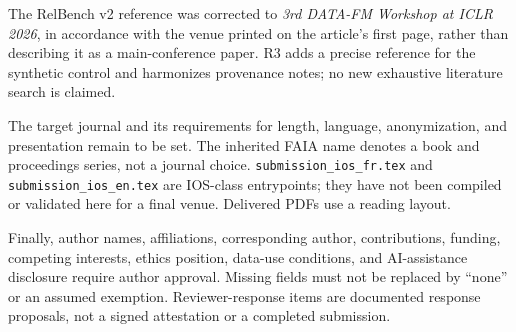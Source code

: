 \documentclass[10pt,a4paper]{article}
\newcommand{\src}[1]{{\small\nolinkurl{#1}}}
\begin{document}
The RelBench v2 reference was corrected to \emph{3rd DATA-FM Workshop at ICLR 2026}, in accordance with the venue printed on the article's first page, rather than describing it as a main-conference paper\cite{gu2026relbench}. R3 adds a precise reference for the synthetic control and harmonizes provenance notes; no new exhaustive literature search is claimed.

The target journal and its requirements for length, language, anonymization, and presentation remain to be set. The inherited FAIA name denotes a book and proceedings series, not a journal choice. \src{submission_ios_fr.tex} and \src{submission_ios_en.tex} are IOS-class entrypoints; they have not been compiled or validated here for a final venue. Delivered PDFs use a reading layout.

Finally, author names, affiliations, corresponding author, contributions, funding, competing interests, ethics position, data-use conditions, and AI-assistance disclosure require author approval. Missing fields must not be replaced by “none” or an assumed exemption. Reviewer-response items are documented response proposals, not a signed attestation or a completed submission.



\end{document}
